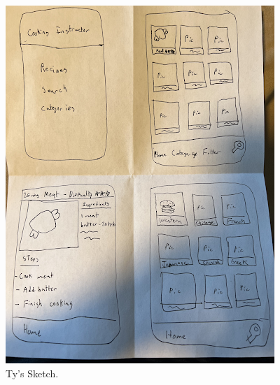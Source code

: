 \documentclass[11pt,english]{article}
\begin{document}
\begin{figure}
\centering
  \includegraphics[width=\linewidth]{figure2.png}
  \caption{Ty's Sketch.}
  \label{fig:figure2}
\end{figure}
\end{document}
